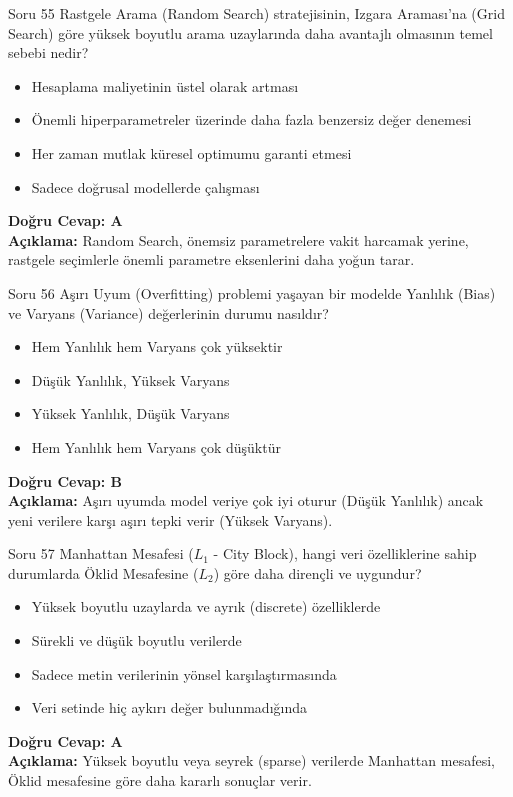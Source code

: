 \documentclass[12pt,a4paper]{article}
\begin{document}
\begin{testcard}{Soru 55}
    Rastgele Arama (Random Search) stratejisinin, Izgara Araması'na (Grid Search) göre yüksek boyutlu arama uzaylarında daha avantajlı olmasının temel sebebi nedir?
    \begin{itemize}
        \item[A)] Hesaplama maliyetinin üstel olarak artması
        \item[B)] Önemli hiperparametreler üzerinde daha fazla benzersiz değer denemesi
        \item[C)] Her zaman mutlak küresel optimumu garanti etmesi
        \item[D)] Sadece doğrusal modellerde çalışması
    \end{itemize}
    \tcblower
    \textbf{Doğru Cevap: A} \\
    \textbf{Açıklama:} Random Search, önemsiz parametrelere vakit harcamak yerine, rastgele seçimlerle önemli parametre eksenlerini daha yoğun tarar.
\end{testcard}
\begin{testcard}{Soru 56}
    Aşırı Uyum (Overfitting) problemi yaşayan bir modelde Yanlılık (Bias) ve Varyans (Variance) değerlerinin durumu nasıldır?
    \begin{itemize}
        \item[A)] Hem Yanlılık hem Varyans çok yüksektir
        \item[B)] Düşük Yanlılık, Yüksek Varyans
        \item[C)] Yüksek Yanlılık, Düşük Varyans
        \item[D)] Hem Yanlılık hem Varyans çok düşüktür
    \end{itemize}
    \tcblower
    \textbf{Doğru Cevap: B} \\
    \textbf{Açıklama:} Aşırı uyumda model veriye çok iyi oturur (Düşük Yanlılık) ancak yeni verilere karşı aşırı tepki verir (Yüksek Varyans).
\end{testcard}

\begin{testcard}{Soru 57}
    Manhattan Mesafesi ($L_1$ - City Block), hangi veri özelliklerine sahip durumlarda Öklid Mesafesine ($L_2$) göre daha dirençli ve uygundur?
    \begin{itemize}
        \item[A)] Yüksek boyutlu uzaylarda ve ayrık (discrete) özelliklerde
        \item[B)] Sürekli ve düşük boyutlu verilerde
        \item[C)] Sadece metin verilerinin yönsel karşılaştırmasında
        \item[D)] Veri setinde hiç aykırı değer bulunmadığında
    \end{itemize}
    \tcblower
    \textbf{Doğru Cevap: A} \\
    \textbf{Açıklama:} Yüksek boyutlu veya seyrek (sparse) verilerde Manhattan mesafesi, Öklid mesafesine göre daha kararlı sonuçlar verir.
\end{testcard}
\end{document}
